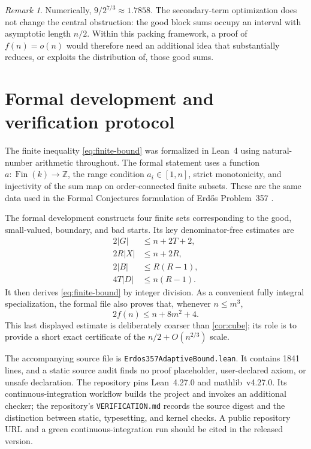 \documentclass[11pt]{article}
\numberwithin{equation}{section}
\theoremstyle{remark}
\newtheorem{remark}[theorem]{Remark}
\begin{document}
\begin{remark}
Numerically, \(9/2^{7/3}\approx1.7858\).  The secondary-term
optimization does not change the central obstruction: the good block
sums occupy an interval with asymptotic length \(n/2\).  Within this
packing framework, a proof of \(f(n)=o(n)\) would therefore need an
additional idea that substantially reduces, or exploits the
distribution of, those good sums.
\end{remark}

\section{Formal development and verification protocol}

The finite inequality \eqref{eq:finite-bound} was formalized in
Lean~4 using natural-number arithmetic throughout.  The formal
statement uses a function \(a:\operatorname{Fin}(k)\to\mathbb Z\),
the range condition \(a_i\in[1,n]\), strict monotonicity, and
injectivity of the sum map on order-connected finite subsets.  These
are the same data used in the Formal Conjectures formulation of
Erd\H{o}s Problem~357 \cite{FormalConjectures}.

The formal development constructs four finite sets corresponding to
the good, small-valued, boundary, and bad starts.  Its key
denominator-free estimates are
\begin{align*}
  2|G|&\leq n+2T+2,\\
  2R|X|&\leq n+2R,\\
  2|B|&\leq R(R-1),\\
  4T|D|&\leq n(R-1).
\end{align*}
It then derives \eqref{eq:finite-bound} by integer division.  As a
convenient fully integral specialization, the formal file also proves
that, whenever \(n\leq m^3\),
\begin{equation}
  2f(n)\leq n+8m^2+4.
  \label{eq:lean-cube}
\end{equation}
This last displayed estimate is deliberately coarser than
\cref{cor:cube}; its role is to provide a short exact certificate of
the \(n/2+O(n^{2/3})\) scale.

The accompanying source file is
\texttt{Erdos357AdaptiveBound.lean}.  It contains 1841 lines, and a
static source audit finds no proof placeholder, user-declared axiom, or
unsafe declaration.  The repository pins Lean~4.27.0 and
mathlib~v4.27.0.  Its continuous-integration workflow builds the
project and invokes an additional checker; the repository's
\texttt{VERIFICATION.md} records the source digest and the distinction
between static, typesetting, and kernel checks.  A public repository
URL and a green continuous-integration run should be cited in the
released version.
\end{document}
